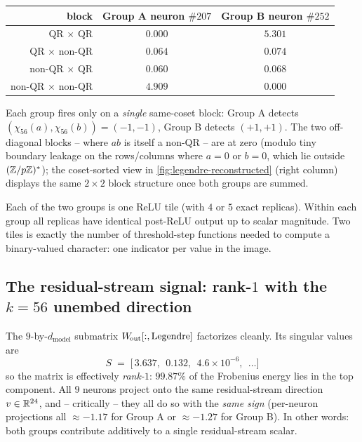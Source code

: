\begin{center}
\begin{tabular}{r|c|c}
  block & Group A neuron $\#207$ & Group B neuron $\#252$ \\ \hline
  QR $\times$ QR              & $0.000$ & $5.301$ \\
  QR $\times$ non-QR          & $0.064$ & $0.074$ \\
  non-QR $\times$ QR          & $0.060$ & $0.068$ \\
  non-QR $\times$ non-QR      & $4.909$ & $0.000$ \\
\end{tabular}
\end{center}

Each group fires only on a \emph{single} same-coset block: Group A
detects $(\chi_{56}(a), \chi_{56}(b)) = (-1, -1)$, Group B detects
$(+1, +1)$.  The two off-diagonal blocks -- where $ab$ is itself a
non-QR -- are at zero (modulo tiny boundary leakage on the rows/columns
where $a = 0$ or $b = 0$, which lie outside $(\mathbb{Z}/p\mathbb{Z})^*$); the
coset-sorted view in \cref{fig:legendre-reconstructed} (right column)
displays the same $2 \times 2$ block structure once both groups are
summed.

Each of the two groups is one ReLU tile (with $4$ or $5$ exact
replicas).  Within each group all replicas have identical post-ReLU
output up to scalar magnitude.  Two tiles is exactly the number of
threshold-step functions needed to compute a binary-valued character:
one indicator per value in the image.

\subsection{The residual-stream signal: rank-$1$ with the $k = 56$ unembed direction}
\label{subsec:legendre-Wout}

The $9$-by-$d_{\text{model}}$ submatrix $W_{\!\text{out}}[:, \text{Legendre}]$
factorizes cleanly.  Its singular values are
\[
  S \;=\; \bigl[\,3.637,\;\, 0.132,\;\, 4.6 \times 10^{-6},\;\, \ldots \bigr]
\]
so the matrix is effectively \emph{rank-$1$}: $99.87\%$ of the Frobenius
energy lies in the top component.  All $9$ neurons project onto the
same residual-stream direction $v \in \mathbb{R}^{24}$, and -- critically --
they all do so with the \emph{same sign} (per-neuron projections all
$\approx -1.17$ for Group A or $\approx -1.27$ for Group B).  In other
words: both groups contribute additively to a single residual-stream
scalar.

